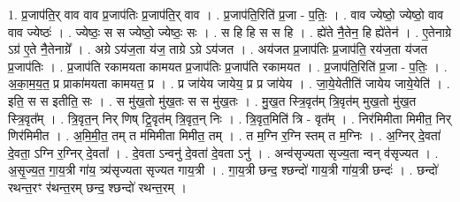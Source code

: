 \documentclass[17pt]{extarticle}
\begin{document}
1. प्र॒जाप॑ति॒र् वाव वाव प्र॒जाप॑तिः प्र॒जाप॑ति॒र् वाव । . प्र॒जाप॑ति॒रिति॑ प्र॒जा - प॒तिः॒ । . वाव ज्येष्ठो॒ ज्येष्ठो॒ वाव वाव ज्येष्ठः॑ । . ज्येष्ठः॒ स स ज्येष्ठो॒ ज्येष्ठः॒ सः । . स हि हि स स हि । . ह्ये॑ते नै॒तेन॒ हि ह्ये॑तेन॑ । . ए॒तेनाग्रे ऽग्र॑ ए॒ते नै॒तेनाग्रे᳚ । . अग्रे ऽय॑ज॒ता य॑ज॒ ताग्रे ऽग्रे ऽय॑जत । . अय॑जत प्र॒जाप॑तिः प्र॒जाप॑ति॒ रय॑ज॒ता य॑जत प्र॒जाप॑तिः । . प्र॒जाप॑ति रकामयता कामयत प्र॒जाप॑तिः प्र॒जाप॑ति रकामयत । . प्र॒जाप॑ति॒रिति॑ प्र॒जा - प॒तिः॒ । . अ॒का॒म॒य॒त॒ प्र प्राका॑मयता कामयत॒ प्र । . प्र जा॑येय जायेय॒ प्र प्र जा॑येय । . जा॒ये॒येतीति॑ जायेय जाये॒येति॑ । . इति॒ स स इतीति॒ सः । . स मु॑ख॒तो मु॑ख॒तः स स मु॑ख॒तः । . मु॒ख॒त स्त्रि॒वृत॑म् त्रि॒वृत॑म् मुख॒तो मु॑ख॒त स्त्रि॒वृत᳚म् । . त्रि॒वृत॒न् निर् णिष् ट्रि॒वृत॑म् त्रि॒वृत॒न् निः । . त्रि॒वृत॒मिति॑ त्रि - वृत᳚म् । . निर॑मिमीता मिमीत॒ निर् णिर॑मिमीत । . अ॒मि॒मी॒त॒ तम् त म॑मिमीता मिमीत॒ तम् । . त म॒ग्नि र॒ग्नि स्तम् त म॒ग्निः । . अ॒ग्निर् दे॒वता॑ दे॒वता॒ ऽग्नि र॒ग्निर् दे॒वता᳚ । . दे॒वता ऽन्वनु॑ दे॒वता॑ दे॒वता ऽनु॑ । . अन्व॑सृज्यता सृज्य॒ता न्वन् व॑सृज्यत । . अ॒सृ॒ज्य॒त॒ गा॒य॒त्री गा॑य॒ त्र्य॑सृज्यता सृज्यत गाय॒त्री । . गा॒य॒त्री छन्द॒ श्छन्दो॑ गाय॒त्री गा॑य॒त्री छन्दः॑ । . छन्दो॑ रथन्त॒रꣳ र॑थन्त॒रम् छन्द॒ श्छन्दो॑ रथन्त॒रम् । \newline
\end{document}

